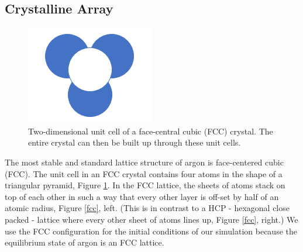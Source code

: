 \documentclass{article}
\begin{document}
\begin{multicols}{2}
\subsection{Crystalline Array}

\begin{figure}[H]
\begin{center}
\includegraphics[width=0.65\linewidth]{plots/crystal_structure.png}
\caption{Two-dimensional unit cell of a face-central cubic (FCC) crystal.  The entire crystal can then be built up through these unit cells.}
\label{unitcell}
\end{center}
\end{figure}

The most stable and standard lattice structure of argon is face-centered cubic (FCC).  The unit cell in an FCC crystal contains four atoms in the shape of a triangular pyramid, Figure \ref{unitcell}.  In the FCC lattice, the sheets of atoms stack on top of each other in such a way that every other layer is off-set by half of an atomic radius, Figure \ref{fcc}, left.  (This is in contrast to a HCP - hexagonal close packed - lattice where every other sheet of atoms lines up, Figure \ref{fcc}, right.)  \cite{crystal}  We use the FCC configuration for the initial conditions of our simulation because the equilibrium state of argon is an FCC lattice.  


\end{multicols}
\end{document}
